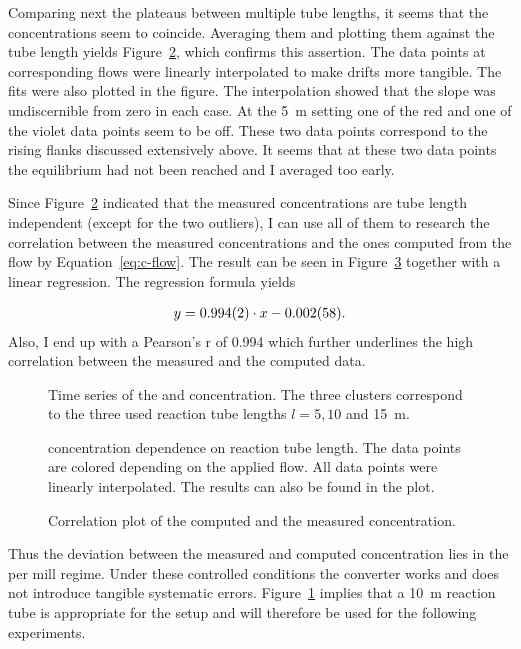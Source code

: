 Comparing next the  plateaus between multiple tube lengths, it
seems that the concentrations seem to coincide. Averaging them and
plotting them against the tube length yields
Figure~\ref{fig:no-length}, which confirms this assertion. The data
points at corresponding flows were linearly interpolated to make
drifts more tangible. The fits were also plotted in the figure. The
interpolation showed that the slope was undiscernible from zero in
each case. At the \SI{5}{\meter} setting one of the red and one of the
violet data points seem to be off. These two data points correspond to
the rising flanks discussed extensively above. It seems that at these
two data points the equilibrium had not been reached and I averaged
too early.

Since Figure~\ref{fig:no-length} indicated that the measured
concentrations are tube length independent (except for the two
outliers), I can use all of them to research the correlation between
the measured concentrations and the ones computed from the flow by
Equation~\eqref{eq:c-flow}. The result can be seen in
Figure~\ref{fig:no-calib} together with a linear regression. The
regression formula yields

\begin{align*}
  y = \num{0.994 \pm 0.002}  \cdot x -\num{0.002 \pm 0.058}.
\end{align*}
Also, I end up with a Pearson's r of 0.994 which further underlines the high
correlation between the measured and the computed data.
\begin{figure}[htbp]
  \centering
  
  \hfill
  
  \caption{Time series of the  and  concentration. The
    three clusters correspond to the three used reaction tube lengths
    $l = 5, 10$ and \SI{15}{\meter}.}
  \label{fig:ts}
\end{figure}
\begin{figure}[htbp]
  \centering
  
  \caption{ concentration dependence on reaction tube
    length. The data points are colored depending on the applied
     flow. All data points were linearly interpolated. The
    results can also be found in the plot.}
  \label{fig:no-length}
\end{figure}

\begin{figure}[htbp]
  \centering
  
  \caption{Correlation plot of the computed and the measured 
    concentration.}
  \label{fig:no-calib}
\end{figure}

Thus the deviation between the measured and computed concentration
lies in the per mill regime. Under these controlled conditions the
converter works and does not introduce tangible systematic
errors. Figure~\ref{fig:ts} implies that a \SI{10}{\meter} reaction
tube is appropriate for the setup and will therefore be used for the
following experiments.

